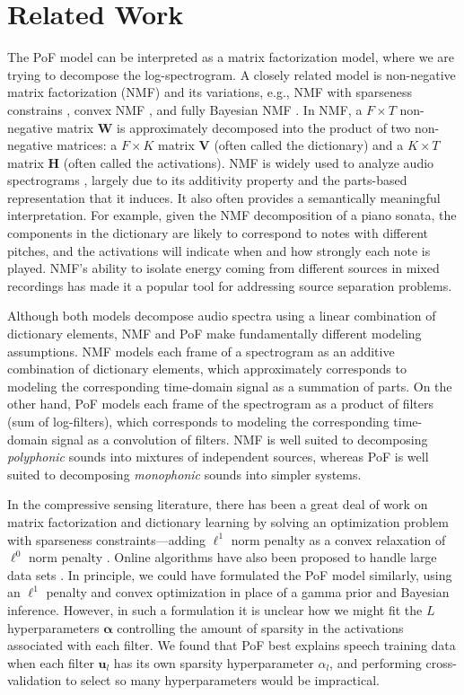\documentclass{article} %
\begin{document}
\section{Related Work}
The PoF model can be interpreted as a matrix factorization model,
where we are trying to decompose the log-spectrogram. A closely
related model is non-negative matrix factorization (NMF)
\cite{seung2001algorithms} and its variations, e.g., NMF with
sparseness constrains \cite{hoyer2004non}, convex NMF
\cite{ding2010convex}, and fully Bayesian NMF
\cite{cemgil2009bayesian}. In NMF, a $F \times T$ non-negative matrix
$\mathbf{W}$ is approximately decomposed into the product of two
non-negative matrices: a $F\times K$ matrix $\mathbf{V}$ (often called
the dictionary) and a $K \times T$ matrix $\mathbf{H}$ (often called
the activations).  NMF is widely used to analyze audio
spectrograms \cite{neco09, smaragdis2003non}, largely due to its
additivity property and the parts-based representation that it
induces. It also often provides a semantically meaningful
interpretation. For example, given the NMF decomposition of a piano
sonata, the components in the dictionary are likely to correspond to
notes with different pitches, and the activations will indicate when
and how strongly each note is played. NMF's ability to isolate energy
coming from different sources in mixed recordings has made it a
popular tool for addressing source separation problems.

Although both models decompose audio spectra using a linear
combination of dictionary elements, NMF and PoF make fundamentally
different modeling assumptions. NMF models each frame of a
spectrogram as an additive combination of dictionary elements, which
approximately corresponds to modeling the corresponding time-domain
signal as a summation of parts. On the other hand, PoF models each
 frame of the spectrogram as a product of filters (sum of
log-filters), which corresponds to modeling the corresponding
time-domain signal as a convolution of filters. NMF is well suited to
decomposing \emph{polyphonic} sounds into mixtures of independent
sources, whereas PoF is well suited to decomposing \emph{monophonic}
sounds into simpler systems.

In the compressive sensing literature, there has been a great deal of
work on matrix factorization and dictionary learning by solving an
optimization problem with sparseness constraints---adding $\ell^1$
norm penalty as a convex relaxation of $\ell^0$ norm penalty
\cite{donoho2003optimally}. Online algorithms have also been proposed to
handle large data sets \cite{mairal2010online}. In principle, we could
have formulated the PoF model similarly, using an $\ell^1$ penalty and
convex optimization in place of a gamma prior and Bayesian inference.
However, in such a formulation it is unclear how we might fit the $L$
hyperparameters $\bm{\alpha}$ controlling the amount of sparsity in
the activations associated with each filter. We found that PoF best
explains speech training data when each filter $\bm{u}_l$ has its own
sparsity hyperparameter $\alpha_l$, and performing cross-validation to
select so many hyperparameters would be impractical.
\end{document}
